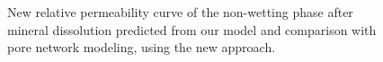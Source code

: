 \documentclass[preprint,12pt,authoryear]{elsarticle}
\begin{document}
\begin{figure} 
\centering \setlength\figureheight{6cm} \setlength\figurewidth{6cm}  \caption{New relative permeability curve of the non-wetting phase after mineral dissolution predicted from our model and comparison with pore network modeling, using the new approach.} \label{fig:KrgDss} 
\end{figure}
%
%
%
%
%
%
%
\end{document}
